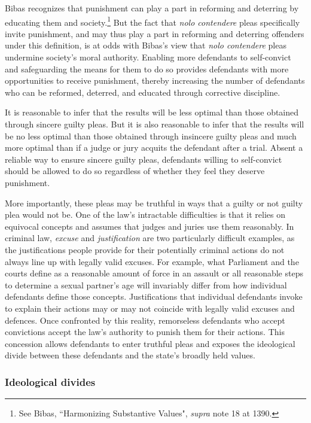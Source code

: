 Bibas recognizes that punishment can play a part in reforming and deterring by educating them and society.\footnote{See Bibas, ``Harmonizing Substantive Values", \textit{supra} note 18 at 1390.} But the fact that \textit{nolo contendere} pleas specifically invite punishment, and may thus play a part in reforming and deterring offenders under this definition, is at odds with Bibas's view that \textit{nolo contendere} pleas undermine society's moral authority. Enabling more defendants to self-convict and safeguarding the means for them to do so provides defendants with more opportunities to receive punishment, thereby increasing the number of defendants who can be reformed, deterred, and educated through corrective discipline. 

It is reasonable to infer that the results will be less optimal than those obtained through sincere guilty pleas. But it is also reasonable to infer that the results will be no less optimal than those obtained through insincere guilty pleas and much more optimal than if a judge or jury acquits the defendant after a trial. Absent a reliable way to ensure sincere guilty pleas, defendants willing to self-convict should be allowed to do so regardless of whether they feel they deserve punishment.

More importantly, these pleas may be truthful in ways that a guilty or not guilty plea would not be. One of the law's intractable difficulties is that it relies on equivocal concepts and assumes that judges and juries use them reasonably. In criminal law, \textit{excuse} and \textit{justification} are two particularly difficult examples, as the justifications people provide for their potentially criminal actions do not always line up with legally valid excuses. For example, what Parliament and the courts define as a reasonable amount of force in an assault or all reasonable steps to determine a sexual partner's age will invariably differ from how individual defendants define those concepts. Justifications that individual defendants invoke to explain their actions may or may not coincide with legally valid excuses and defences. Once confronted by this reality, remorseless defendants who accept convictions accept the law's authority to punish them for their actions. This concession allows defendants to enter truthful pleas and exposes the ideological divide between these defendants and the state's broadly held values.

\subsubsection{Ideological divides}

